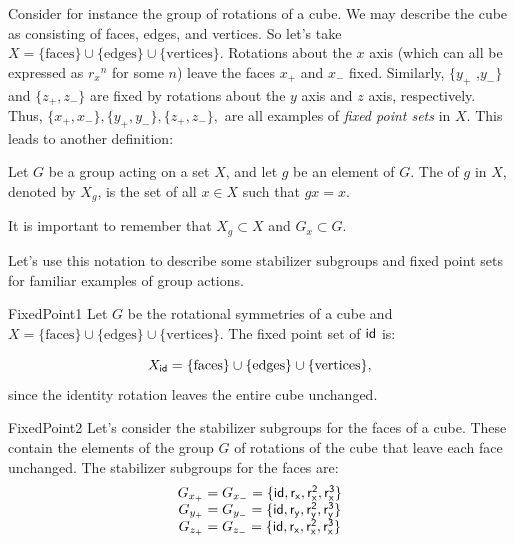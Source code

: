 Consider for instance the group of rotations of a cube. We may describe the cube as consisting of faces, edges, and vertices. So let's take   $X=\{\text{faces}\}\cup\{\text{edges}\}\cup\{\text{vertices}\}$.  Rotations about the $x$ axis (which can all be expressed as ${r_x}^n$ for some $n$) leave the faces $x_+$ and $x_-$ fixed. Similarly, $\{y_+$ ,$y_-\}$ and $\{z_+,z_-\}$ are  fixed by rotations about the $y$ axis and $z$ axis, respectively.   Thus, $\{x_+,x_-\},\{y_+,y_-\},\{z_+,z_-\},$  are all examples of \emph{fixed point sets} in $X$.
This leads to another definition:

\begin{defn} \label{FixedPoint}
Let $G$ be a group acting on a set $X$, and let $g$ be
an element of $G$. The  of $g$ in $X$, denoted by $X_g$, is the set of 
all $x \in X$ such that $gx = x$.
\end{defn}
\noindent
It is important to remember that $X_g \subset X$ and $G_x \subset G$. 

Let's use this notation to describe some stabilizer subgroups and fixed point sets for familiar examples of group actions.

\begin{example}{FixedPoint1}
Let $G$ be the rotational symmetries of a cube and $X=\{\text{faces}\}\cup\{\text{edges}\}\cup\{\text{vertices}\}$.
The fixed point set of $\sf{id}$ is: 

$$X_{\sf{id}}=\{\text{faces}\}\cup\{\text{edges}\}\cup\{\text{vertices}\},$$
since the identity rotation  leaves the entire cube unchanged.  
\end {example}

\begin{example}{FixedPoint2}
Let's consider the stabilizer subgroups for the faces of a cube.  These contain the elements of the group $G$ of rotations of the cube that leave each face unchanged.  The stabilizer subgroups for the faces are:
$$\begin{array} {c}
G_{x_+}=G_{x_-}=\{\sf{id},r_x,r_x^2,r_x^3\}\\
G_{y_+}=G_{y_-}=\{\sf{id},r_y,r_y^2,r_y^3\}\\
G_{z_+}=G_{z_-}=\{\sf{id},r_x,r_x^2,r_x^3\}
\end {array}$$
\end{example}

